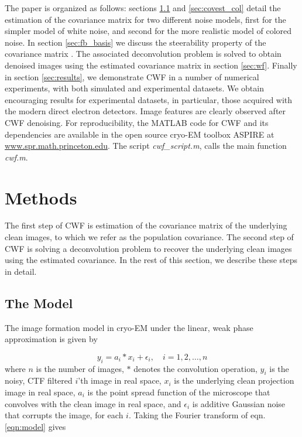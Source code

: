 \documentclass[review]{elsarticle}
\begin{document}
The paper is organized as follows: sections \ref{sec:model} and 
\ref{sec:covest_col} detail the estimation of the covariance matrix for two different noise models, first for the
simpler model of white noise, and second for the more realistic model of colored noise.
In section \ref{sec:fb_basis} we discuss the steerability
property of the covariance matrix \cite{ffbspca}. 
The associated deconvolution problem
is solved to obtain denoised images using the estimated covariance matrix in section \ref{sec:wf}.
Finally in section \ref{sec:results},
we demonstrate CWF in a number of numerical experiments, with both simulated and experimental datasets.
We obtain encouraging results for experimental datasets, in particular, those acquired with the modern
direct electron detectors. Image features are clearly observed after CWF denoising. For reproducibility,
the MATLAB code for CWF and its dependencies are available in the open source
cryo-EM toolbox ASPIRE at \url{www.spr.math.princeton.edu}. The script \textit{cwf\_script.m},
calls the main function \textit{cwf.m}.

\section{Methods}
The first 
step of CWF is estimation of the
covariance matrix of the underlying clean images, to which we refer as
the population covariance. The second step of CWF is 
solving a deconvolution problem to recover
the underlying clean images using the estimated covariance. In the rest 
of this section,
we describe these steps in detail.

\subsection{The Model}
\label{sec:model}
The image formation model in cryo-EM under the linear, weak phase 
approximation \cite{Frankbook} is given by 

\begin{equation}
 y_i = a_i \ast x_i + \epsilon_i, \quad i=1,2,\ldots,n
\label{eqn:model}
\end{equation}
where $n$ is the number of images, $\ast$ denotes the convolution operation, $y_i$ is the noisy, CTF filtered $i$'th image in real
space, $x_i$ is the underlying clean projection image in 
real space, 
$a_{i}$ is the point spread function of the microscope that
convolves with the clean image in real space, and $\epsilon_i$ is 
additive Gaussian noise that corrupts the image, for each $i$. Taking the Fourier transform of 
eqn. \ref{eqn:model} gives
\end{document}

